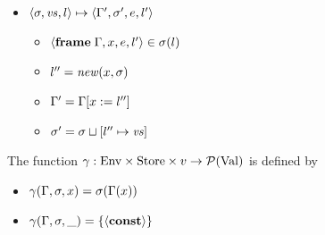 \documentclass{article}
\begin{document}
\begin{minipage}{\textwidth}
\begin{minipage}[t]{0.5\textwidth}
\begin{itemize}
\item $\langle\sigma,\mathit{vs},l\rangle\mapsto\langle\Gamma',\sigma',e,l'\rangle$
\begin{itemize}
\item $\langle\mathbf{frame}\; \Gamma,x,e,l'\rangle\in \sigma(l)$
\item $l''=\mathit{new}(x,\sigma)$
\item $\Gamma' = \Gamma[x:=l'']$
\item $\sigma' = \sigma\sqcup[l''\mapsto \mathit{vs}]$
\end{itemize}
\end{itemize}

The function $\gamma : \text{Env}\times \text{Store}\times v\to \mathcal P(\text{Val})$ is defined by

\begin{itemize}
  \item $\gamma(\Gamma,\sigma,x) = \sigma(\Gamma(x))$
  \item $\gamma(\Gamma,\sigma,\_) = \left\{\langle\mathbf{const}\rangle\right\}$
\end{itemize}

\end{minipage}
\end{minipage}
\end{document}
